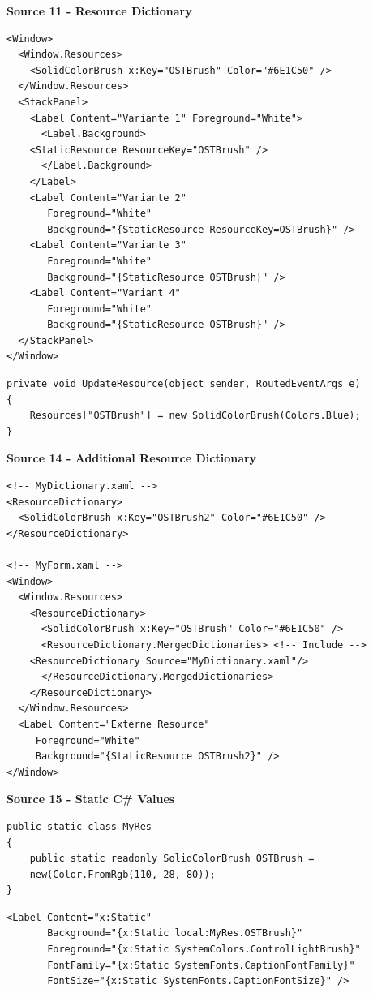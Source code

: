 \documentclass[10pt,twoside,landscape]{article}
\begin{document}
\begin{multicols}{2}
\textbf{Source 11 - Resource Dictionary}
\lstset{language=XML,label= ,caption= ,captionpos=b,numbers=none}
\begin{lstlisting}
<Window>
  <Window.Resources>
    <SolidColorBrush x:Key="OSTBrush" Color="#6E1C50" />
  </Window.Resources>
  <StackPanel>
    <Label Content="Variante 1" Foreground="White">
      <Label.Background>
	<StaticResource ResourceKey="OSTBrush" />
      </Label.Background>
    </Label>
    <Label Content="Variante 2"
	   Foreground="White"
	   Background="{StaticResource ResourceKey=OSTBrush}" />
    <Label Content="Variante 3"
	   Foreground="White"
	   Background="{StaticResource OSTBrush}" />
    <Label Content="Variant 4"
	   Foreground="White"
	   Background="{StaticResource OSTBrush}" />
  </StackPanel>
</Window>
\end{lstlisting}

\lstset{language=csharp,label= ,caption= ,captionpos=b,numbers=none}
\begin{lstlisting}
private void UpdateResource(object sender, RoutedEventArgs e)
{
    Resources["OSTBrush"] = new SolidColorBrush(Colors.Blue);
}
\end{lstlisting}

\textbf{Source 14 - Additional Resource Dictionary}
\lstset{language=XML,label= ,caption= ,captionpos=b,numbers=none}
\begin{lstlisting}
<!-- MyDictionary.xaml -->
<ResourceDictionary>
  <SolidColorBrush x:Key="OSTBrush2" Color="#6E1C50" />
</ResourceDictionary>

<!-- MyForm.xaml -->
<Window>
  <Window.Resources>
    <ResourceDictionary>
      <SolidColorBrush x:Key="OSTBrush" Color="#6E1C50" />
      <ResourceDictionary.MergedDictionaries> <!-- Include -->
	<ResourceDictionary Source="MyDictionary.xaml"/>
      </ResourceDictionary.MergedDictionaries>
    </ResourceDictionary>
  </Window.Resources>
  <Label Content="Externe Resource"
	 Foreground="White"
	 Background="{StaticResource OSTBrush2}" />
</Window>
\end{lstlisting}

\textbf{Source 15 - Static C\# Values}
\lstset{language=csharp,label= ,caption= ,captionpos=b,numbers=none}
\begin{lstlisting}
public static class MyRes
{
    public static readonly SolidColorBrush OSTBrush =
	new(Color.FromRgb(110, 28, 80));
}
\end{lstlisting}

\lstset{language=XML,label= ,caption= ,captionpos=b,numbers=none}
\begin{lstlisting}
<Label Content="x:Static"
       Background="{x:Static local:MyRes.OSTBrush}"
       Foreground="{x:Static SystemColors.ControlLightBrush}"
       FontFamily="{x:Static SystemFonts.CaptionFontFamily}"
       FontSize="{x:Static SystemFonts.CaptionFontSize}" />
\end{lstlisting}


\end{multicols}
\end{document}
